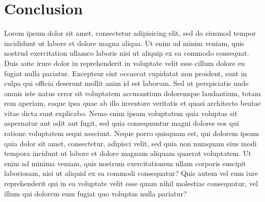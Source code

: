 \documentclass[journal]{IEEEtran}
\begin{document}




\section{Conclusion}
Lorem ipsum dolor sit amet, consectetur adipisicing elit, sed do eiusmod tempor incididunt ut labore et dolore magna aliqua. Ut enim ad minim veniam, quis nostrud exercitation ullamco laboris nisi ut aliquip ex ea commodo consequat. Duis aute irure dolor in reprehenderit in voluptate velit esse cillum dolore eu fugiat nulla pariatur. Excepteur sint occaecat cupidatat non proident, sunt in culpa qui officia deserunt mollit anim id est laborum. Sed ut perspiciatis unde omnis iste natus error sit voluptatem accusantium doloremque laudantium, totam rem aperiam, eaque ipsa quae ab illo inventore veritatis et quasi architecto beatae vitae dicta sunt explicabo. Nemo enim ipsam voluptatem quia voluptas sit aspernatur aut odit aut fugit, sed quia consequuntur magni dolores eos qui ratione voluptatem sequi nesciunt. Neque porro quisquam est, qui dolorem ipsum quia dolor sit amet, consectetur, adipisci velit, sed quia non numquam eius modi tempora incidunt ut labore et dolore magnam aliquam quaerat voluptatem. Ut enim ad minima veniam, quis nostrum exercitationem ullam corporis suscipit laboriosam, nisi ut aliquid ex ea commodi consequatur? Quis autem vel eum iure reprehenderit qui in ea voluptate velit esse quam nihil molestiae consequatur, vel illum qui dolorem eum fugiat quo voluptas nulla pariatur?


\end{document}

